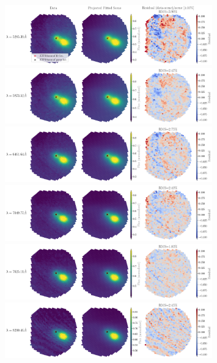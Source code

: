\documentclass[../main/main.tex]{subfiles}
\begin{document}
\begin{figure}
  \centering
  \includegraphics[width=0.8\textwidth]{../figures/07_scene/fitted_metasliceZTF18accrorf_0.png}
  \includegraphics[width=0.8\textwidth]{../figures/07_scene/fitted_metasliceZTF18accrorf_1.png}
  \includegraphics[width=0.8\textwidth]{../figures/07_scene/fitted_metasliceZTF18accrorf_2.png}
  \includegraphics[width=0.8\textwidth]{../figures/07_scene/fitted_metasliceZTF18accrorf_3.png}
  \includegraphics[width=0.8\textwidth]{../figures/07_scene/fitted_metasliceZTF18accrorf_4.png}
  \includegraphics[width=0.8\textwidth]{../figures/07_scene/fitted_metasliceZTF18accrorf_5.png}

\end{figure}
\end{document}
